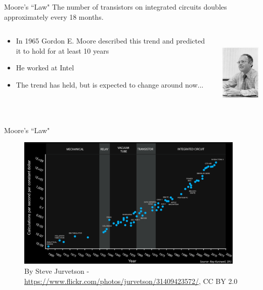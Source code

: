 \documentclass[xcolor=x11names,compress]{beamer}
\renewcommand{\(}{\begin{columns}}
\renewcommand{\)}{\end{columns}}
\newcommand{\<}[1]{\begin{column}{#1}}
\renewcommand{\>}{\end{column}}
\begin{document}
\begin{frame}{Moore's ``Law"}
The number of transistors on integrated circuits doubles approximately every 18 months. 

\begin{columns}
  \begin{column}{0.7\textwidth}
\begin{itemize}
\item In 1965 Gordon E. Moore described this trend and predicted it to hold for at least 10 years\vspace*{0.5 em}
\item He worked at Intel\vspace*{0.5 em}
\item The trend has held, but is expected to change around now...
\end{itemize}
  \end{column}
  \begin{column}{0.3\textwidth}
    \includegraphics[height=1.5in,clip]{../figs/GordonMoore1975}
  \end{column}
\end{columns}
\end{frame}

\begin{frame}{Moore's ``Law"}

\begin{figure}
\includegraphics[height=2.5in,clip]{../figs/Moores-Law-120-Years}
\caption{By Steve Jurvetson - \url{https://www.flickr.com/photos/jurvetson/31409423572/}, CC BY 2.0}%
\end{figure}

\end{frame}
\end{document}

